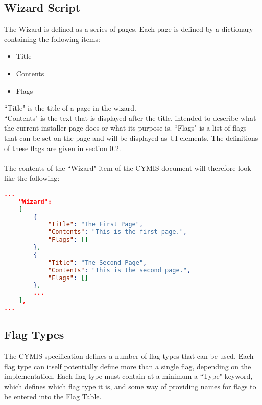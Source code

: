 \documentclass{article}
\begin{document}
\subsection{Wizard Script}\label{section:wizardscript}
The Wizard is defined as a series of pages. Each page is defined by a dictionary containing the following items:
\begin{itemize}
\item Title
\item Contents
\item Flags
\end{itemize}
``Title" is the title of a page in the wizard.\\
``Contents" is the text that is displayed after the title, intended to describe what the current installer page does or what its purpose is.
``Flags" is a list of flags that can be set on the page and will be displayed as UI elements. The definitions of these flags are given in section \ref{section:flagtypes}.\\\\
The contents of the ``Wizard" item of the CYMIS document will therefore look like the following:
\begin{lstlisting}[language=json,firstnumber=1]
...
    "Wizard": 
    [
        {
            "Title": "The First Page",
            "Contents": "This is the first page.",
            "Flags": []        
        },
        {
            "Title": "The Second Page",
            "Contents": "This is the second page.",
            "Flags": []
        },
        ...
    ],
...
\end{lstlisting}
\newpage

\subsection{Flag Types}\label{section:flagtypes}
The CYMIS specification defines a number of flag types that can be used. Each flag type can itself potentially define more than a single flag, depending on the implementation. Each flag type must contain at a minimum a ``Type" keyword, which defines which flag type it is, and some way of providing names for flags to be entered into the Flag Table.
\end{document}
